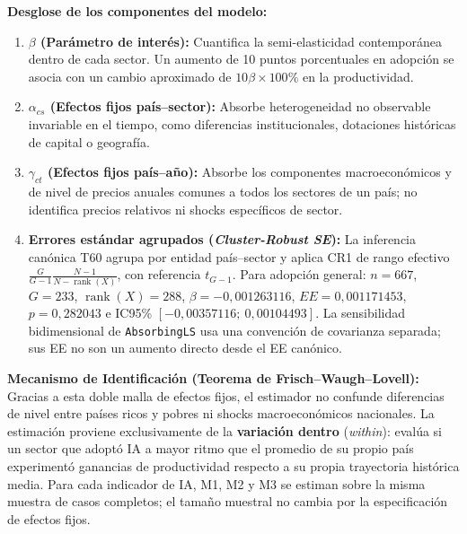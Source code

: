 \documentclass[12pt,a4paper]{article}
\begin{document}
\textbf{Desglose de los componentes del modelo:}
\begin{enumerate}[label=\textbf{\arabic*.}]
  \item \textbf{$\beta$ (Parámetro de interés):} Cuantifica la semi-elasticidad contemporánea dentro de cada sector. Un aumento de 10 puntos porcentuales en adopción se asocia con un cambio aproximado de $10\beta \times 100\%$ en la productividad.
  \item \textbf{$\alpha_{cs}$ (Efectos fijos país--sector):} Absorbe heterogeneidad no observable invariable en el tiempo, como diferencias institucionales, dotaciones históricas de capital o geografía.
  \item \textbf{$\gamma_{ct}$ (Efectos fijos país--año):} Absorbe los componentes macroeconómicos y de nivel de precios anuales comunes a todos los sectores de un país; no identifica precios relativos ni shocks específicos de sector.
  \item \textbf{Errores estándar agrupados (\textit{Cluster-Robust SE}):} La inferencia canónica T60 agrupa por entidad país--sector y aplica CR1 de rango efectivo $\frac{G}{G-1}\frac{N-1}{N-\operatorname{rank}(X)}$, con referencia $t_{G-1}$. Para adopción general: $n=667$, $G=233$, $\operatorname{rank}(X)=288$, $\beta=-0,001263116$, $EE=0,001171453$, $p=0,282043$ e IC95\% $[-0,00357116;\ 0,00104493]$. La sensibilidad bidimensional de \texttt{AbsorbingLS} usa una convención de covarianza separada; sus EE no son un aumento directo desde el EE canónico.
\end{enumerate}

\textbf{Mecanismo de Identificación (Teorema de Frisch--Waugh--Lovell):}
Gracias a esta doble malla de efectos fijos, el estimador no confunde diferencias de nivel entre países ricos y pobres ni shocks macroeconómicos nacionales. La estimación proviene exclusivamente de la \textbf{variación dentro} (\textit{within}): evalúa si un sector que adoptó IA a mayor ritmo que el promedio de su propio país experimentó ganancias de productividad respecto a su propia trayectoria histórica media. Para cada indicador de IA, M1, M2 y M3 se estiman sobre la misma muestra de casos completos; el tamaño muestral no cambia por la especificación de efectos fijos.
\end{document}
